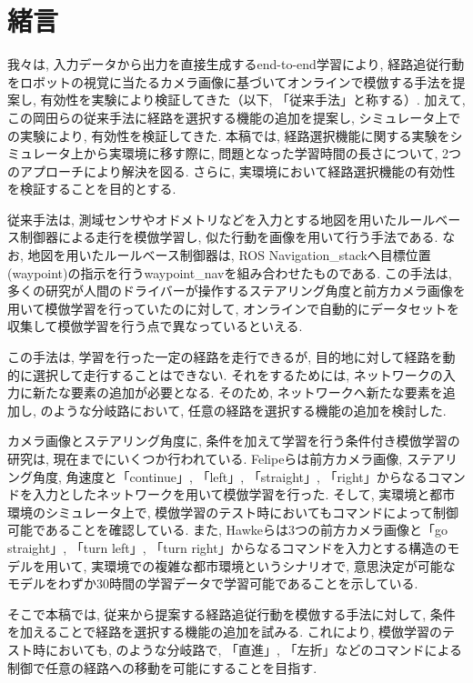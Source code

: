 \documentclass{jarticle}
\begin{document}
\date{} %

\maketitle
\thispagestyle{empty}
\pagestyle{empty}

\small
\section{緒言}%
我々は, 入力データから出力を直接生成するend-to-end学習により, 経路追従行動をロボットの視覚に当たるカメラ画像に基づいてオンラインで模倣する手法を提案し, 有効性を実験により検証してきた\cite{okada1}\cite{okada2}（以下, 「従来手法」と称する）. 加えて, この岡田らの従来手法に経路を選択する機能の追加を提案し, シミュレータ上での実験により, 有効性を検証してきた\cite{mech}. 本稿では, 経路選択機能に関する実験をシミュレータ上から実環境に移す際に, 問題となった学習時間の長さについて, 2つのアプローチにより解決を図る. さらに, 実環境において経路選択機能の有効性を検証することを目的とする.
\par
従来手法は, 測域センサやオドメトリなどを入力とする地図を用いたルールベース制御器による走行を模倣学習し, 似た行動を画像を用いて行う手法である. なお, 地図を用いたルールベース制御器は, ROS Navigation\_stack\cite{nav}へ目標位置(waypoint)の指示を行うwaypoint\_nav\cite{waypoint}を組み合わせたものである. この手法は, 多くの研究\cite{bojarski}\cite{moridian}\cite{hawke}が人間のドライバーが操作するステアリング角度と前方カメラ画像を用いて模倣学習を行っていたのに対して, オンラインで自動的にデータセットを収集して模倣学習を行う点で異なっているといえる.
\par
この手法は, 学習を行った一定の経路を走行できるが, 目的地に対して経路を動的に選択して走行することはできない. それをするためには, ネットワークの入力に新たな要素の追加が必要となる. そのため, ネットワークへ新たな要素を追加し, のような分岐路において, 任意の経路を選択する機能の追加を検討した.
\par
カメラ画像とステアリング角度に, 条件を加えて学習を行う条件付き模倣学習の研究は, 現在までにいくつか行われている. Felipeら\cite{felipe}は前方カメラ画像, ステアリング角度, 角速度と「continue」, 「left」, 「straight」, 「right」からなるコマンドを入力としたネットワークを用いて模倣学習を行った. そして, 実環境と都市環境のシミュレータ上で, 模倣学習のテスト時においてもコマンドによって制御可能であることを確認している. また, Hawkeら\cite{hawke}は3つの前方カメラ画像と「go straight」, 「turn left」, 「turn right」からなるコマンドを入力とする構造のモデルを用いて, 実環境での複雑な都市環境というシナリオで, 意思決定が可能なモデルをわずか30時間の学習データで学習可能であることを示している.
\par
そこで本稿では, 従来から提案する経路追従行動を模倣する手法に対して, 条件を加えることで経路を選択する機能の追加を試みる. これにより, 模倣学習のテスト時においても, のような分岐路で, 
「直進」, 「左折」などのコマンドによる制御で任意の経路への移動を可能にすることを目指す.
\end{document}
